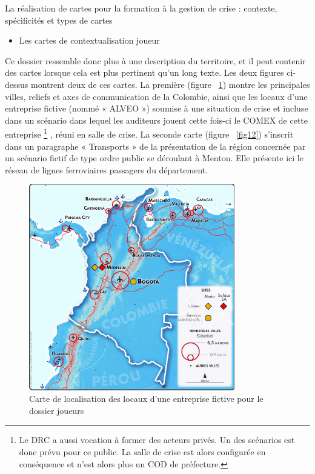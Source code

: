 \documentclass[10pt,a4paper]{report} %
\begin{document}
\begin{part}{La réalisation de cartes pour la formation à la gestion de crise : contexte, spécificités et types de cartes}
\begin{itemize}
    \item Les cartes de contextualisation joueur
\end{itemize}


Ce dossier ressemble donc plus à une description du territoire, et il peut contenir des cartes lorsque cela est plus pertinent qu’un long texte. Les deux figures ci-dessus montrent deux de ces cartes. La première (figure ~\ref{fig11}) montre les principales villes, reliefs et axes de communication de la Colombie, ainsi que les locaux d’une entreprise fictive (nommé « ALVEO ») soumise à une situation de crise et incluse dans un scénario dans lequel les auditeurs jouent cette fois-ci le COMEX de cette entreprise \footnote{Le DRC a aussi vocation à former des acteurs privés. Un des scénarios est donc prévu pour ce public. La salle de crise est alors configurée en conséquence et n’est alors plus un COD de préfecture.} , réuni en salle de crise. La seconde carte (figure ~\ref{fig12}) s’inscrit dans un paragraphe « Transports » de la présentation de la région concernée par un scénario fictif de type ordre public se déroulant à Menton. Elle présente ici le réseau de lignes ferroviaires passagers du département.


\begin{figure}[!t]
    \centering
    \includegraphics[width=0.8\textwidth]{figures/ALVEO_SituationColombie.jpg}
    \caption{Carte de localisation des locaux d’une entreprise fictive pour le dossier joueurs}
    \label{fig11}
\end{figure}


\end{part}
\end{document}
